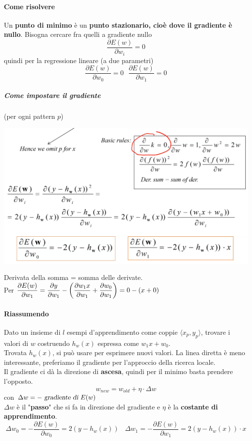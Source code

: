 \documentclass[10pt]{book}
\begin{document}
\paragraph{Come risolvere} Un \textbf{punto di minimo} è un \textbf{punto stazionario, cioè dove il gradiente è nullo}. Bisogna cercare fra quelli a gradiente nullo $$\frac{\partial E(w)}{\partial w_i} = 0$$ quindi per la regressione lineare (a due parametri) $$\frac{\partial E(w)}{\partial w_0} = 0 \:\:\: \frac{\partial E(w)}{\partial w_1} = 0$$
\subparagraph{Come impostare il gradiente} (per ogni pattern $p$)
\begin{center}
	\includegraphics[scale=0.55]{partial.png}
\end{center}
Derivata della somma = somma delle derivate.\\
Per $\mathlarger{\frac{\partial E(w)}{\partial w_1} = \frac{\partial y}{\partial w_1} - \left(\frac{\partial w_1 x}{\partial w_1} + \frac{\partial w_0}{\partial w_1}\right) = 0 - (x + 0)}$
\pagebreak
\paragraph{Riassumendo} Dato un insieme di $l$ esempi d'apprendimento come coppie $\langle x_p, y_p\rangle$, trovare i valori di $w$ costruendo $h_w(x)$ espressa come $w_1 x + w_0$.\\ Trovata $h_w(x)$, si può usare per esprimere nuovi valori. La linea diretta è meno interessante, preferiamo il gradiente per l'approccio della ricerca locale.\\
Il gradiente ci dà la direzione di \textbf{ascesa}, quindi per il minimo basta prendere l'opposto.
$$w_{new} = w_{old} + \eta\cdot\Delta w$$ con $\Delta w  = -\textsl{ gradiente di }E(w)$\\
$\Delta w$ è il "\textbf{passo}" che si fa in direzione del gradiente e $\eta$  è la \textbf{costante di apprendimento}.
$$\Delta w_0 = -\frac{\partial E(w)}{\partial w_0} = 2(y - h_w(x))\:\:\:\:\Delta w_1 = -\frac{\partial E(w)}{\partial w_1} = 2(y - h_w(x))\cdot x$$
\end{document}
